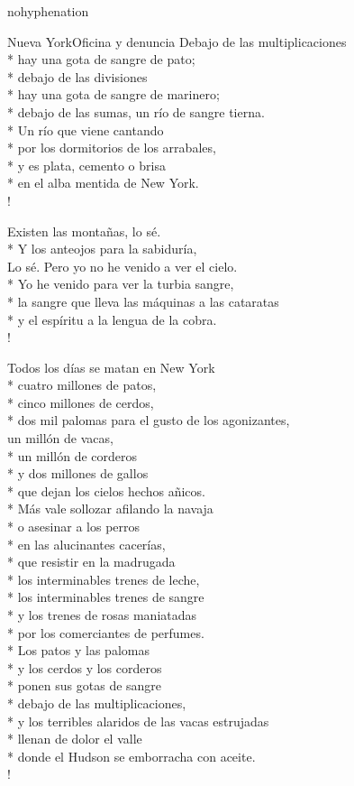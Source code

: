 \documentclass[
    a5paper,
    DIV=10,
    12pt,
    notitlepage,
    oneside,]
{scrbook} %
\begin{document}
\begin{hyphenrules}{nohyphenation}
\begin{poem}{Nueva York}{Oficina y denuncia}{}
Debajo de las multiplicaciones\\*
hay una gota de sangre de pato;\\*
debajo de las divisiones\\*
hay una gota de sangre de marinero;\\*
debajo de las sumas, un río de sangre tierna.\\*
Un río que viene cantando\\*
por los dormitorios de los arrabales,\\*
y es plata, cemento o brisa\\*
en el alba mentida de New York.\\!

Existen las montañas, lo sé.\\*
Y los anteojos para la sabiduría,\\

Lo sé. Pero yo no he venido a ver el cielo.\\*
Yo he venido para ver la turbia sangre,\\*
la sangre que lleva las máquinas a las cataratas\\*
y el espíritu a la lengua de la cobra.\\!

Todos los días se matan en New York\\*
cuatro millones de patos,\\*
cinco millones de cerdos,\\*
dos mil palomas para el gusto de los agonizantes,\\

un millón de vacas,\\*
un millón de corderos\\*
y dos millones de gallos\\*
que dejan los cielos hechos añicos.\\*
Más vale sollozar afilando la navaja\\*
o asesinar a los perros\\*
en las alucinantes cacerías,\\*
que resistir en la madrugada\\*
los interminables trenes de leche,\\*
los interminables trenes de sangre\\*
y los trenes de rosas maniatadas\\*
por los comerciantes de perfumes.\\*
Los patos y las palomas\\*
y los cerdos y los corderos\\*
ponen sus gotas de sangre\\*
debajo de las multiplicaciones,\\*
y los terribles alaridos de las vacas estrujadas\\*
llenan de dolor el valle\\*
donde el Hudson se emborracha con aceite.\\!


\end{poem}
\end{hyphenrules}
\end{document}
